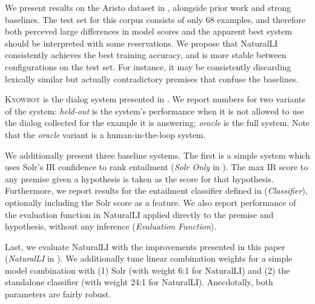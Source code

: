 %
%
We present results on the Aristo dataset in ,
  alongside prior work and strong baselines.
The test set for this corpus consists of only 68 examples,
  and therefore both perceved large differences in model scores 
  and the apparent best system should be interpreted with some reservations.
We propose that NaturalLI consistently achieves the best training accuracy,
  and is more stable between configurations on the test set.
For instance,
  it may be consistently discarding lexically similar but actually contradictory
  premises that confuse the baselines.

\textsc{Knowbot} is the dialog system presented in 
  .
We report numbers for two variants of the system:
  \textit{held-out} is the system's performance when it is not allowed
  to use the dialog collected for the example it is answering;
  \textit{oracle} is the full system.
Note that the \textit{oracle} variant is a human-in-the-loop system.

We additionally present three baseline systems.
The first is a simple system which uses Solr's IR confidence to rank
  entailment (\textit{Solr Only} in ).
The max IR score to any premise given a hypothesis is taken
  as the score for that hypothesis.
Furthermore, we report results for the entailment classifier defined
  in  (\textit{Classifier}), optionally
  including the Solr score as a feature.
We also report performance of the evaluation function in NaturalLI
  applied directly to the premise and hypothesis, without any inference
  (\textit{Evaluation Function}).

Last, we evaluate NaturalLI with the improvements presented in this paper
  (\textit{NaturalLI} in ).
We additionally tune linear combination weights for a 
  simple model combination with
  (1) Solr (with weight 6:1 for NaturalLI) and 
  (2) the standalone classifier (with weight 24:1 for NaturalLI).
Anecdotally, both parameters are fairly robust.


